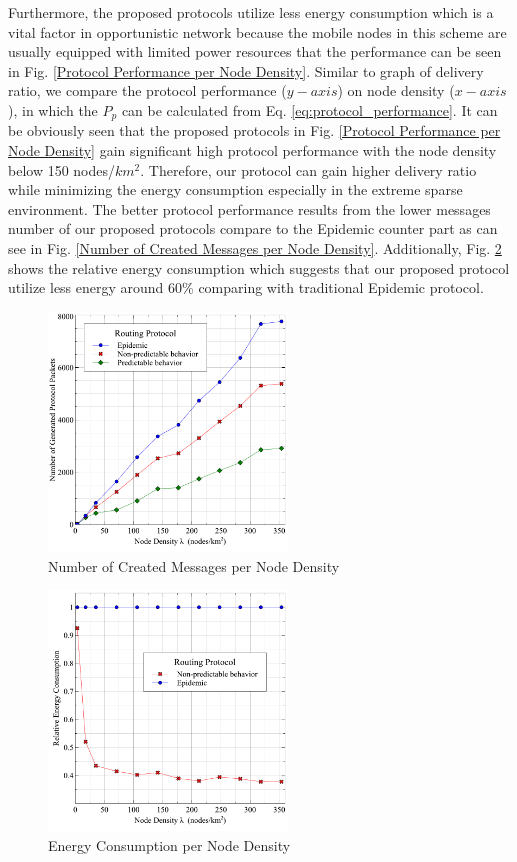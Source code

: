 \documentclass[conference]{IEEEtran}
\begin{document}
Furthermore, the proposed protocols utilize less energy consumption which is a vital factor in opportunistic network because the mobile nodes in this scheme are usually equipped with limited power resources that the performance can be seen in Fig. \ref{Protocol Performance per Node Density}.
Similar to graph of delivery ratio, we compare the protocol performance ($y-axis$) on node density ($x-axis$), in which the $P_p$ can be calculated from Eq. \ref{eq:protocol_performance}.
It can be obviously seen that the proposed protocols in Fig. \ref{Protocol Performance per Node Density} gain significant high protocol performance with the node density below 150 nodes/$km^2$.
Therefore, our protocol can gain higher delivery ratio while minimizing the energy consumption especially in the extreme sparse environment.
The better protocol performance results from the lower messages number of our proposed protocols compare to the Epidemic counter part as can see in Fig. \ref{Number of Created Messages per Node Density}.
Additionally, Fig. \ref{Energy Consumption per Node Density} shows the relative energy consumption which suggests that our proposed protocol utilize less energy around 60\% comparing with traditional Epidemic protocol.


\begin{figure}[!t]
	\centering
	\includegraphics[width=2.5in]{Graphs/messages.pdf}
	\caption{Number of Created Messages per Node Density}
	\label{Number of Generated Protocol Packets}
\end{figure}

\begin{figure}[!t]
	\centering
	\includegraphics[width=2.5in]{Graphs/EnergyConsumption.pdf}
	\caption{Energy Consumption per Node Density}
	\label{Energy Consumption per Node Density}
\end{figure}
\end{document}
